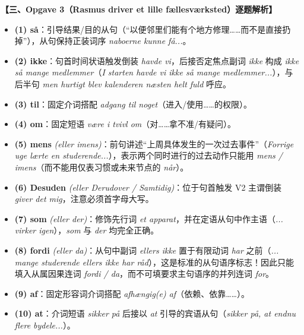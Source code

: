 \begin{answerbox}
\textbf{\color{NCDNavy}【三、Opgave 3（Rasmus driver et lille fællesværksted）逐题解析】}
\begin{itemize}
  \item \textbf{(1) så}：引导结果/目的从句（“以便邻里们能有个地方修理……而不是直接扔掉”），从句保持正装词序 \textit{naboerne kunne få...}。
  \item \textbf{(2) ikke}：句首时间状语触发倒装 \textit{havde vi}，后接否定焦点副词 \textit{ikke} 构成 \textit{ikke så mange medlemmer}（\textit{I starten havde vi ikke så mange medlemmer...}），与后半句 \textit{men hurtigt blev kalenderen næsten helt fuld} 呼应。
  \item \textbf{(3) til}：固定介词搭配 \textit{adgang til noget}（进入/使用……的权限）。
  \item \textbf{(4) om}：固定短语 \textit{være i tvivl om}（对……拿不准/有疑问）。
  \item \textbf{(5) mens} \textit{(eller imens)}：前句讲述“上周具体发生的一次过去事件”（\textit{Forrige uge lærte en studerende...}），表示两个同时进行的过去动作只能用 \textit{mens / imens}（而不能用仅表习惯或未来节点的 \textit{når}）。
  \item \textbf{(6) Desuden} \textit{(eller Derudover / Samtidig)}：位于句首触发 V2 主谓倒装 \textit{giver det mig}，注意必须首字母大写。
  \item \textbf{(7) som} \textit{(eller der)}：修饰先行词 \textit{et apparat}，并在定语从句中作主语（\textit{... virker igen}），\textit{som} 与 \textit{der} 均完全正确。
  \item \textbf{(8) fordi} \textit{(eller da)}：从句中副词 \textit{ellers ikke} 置于有限动词 \textit{har} 之前（\textit{... mange studerende ellers ikke har råd}），这是标准的从句语序标志！因此只能填入从属因果连词 \textit{fordi / da}，而不可填要求主句语序的并列连词 \textit{for}。
  \item \textbf{(9) af}：固定形容词介词搭配 \textit{afhængig(e) af}（依赖、依靠……）。
  \item \textbf{(10) at}：介词短语 \textit{sikker på} 后接以 \textit{at} 引导的宾语从句（\textit{sikker på, at endnu flere bydele...}）。
\end{itemize}
\end{answerbox}

